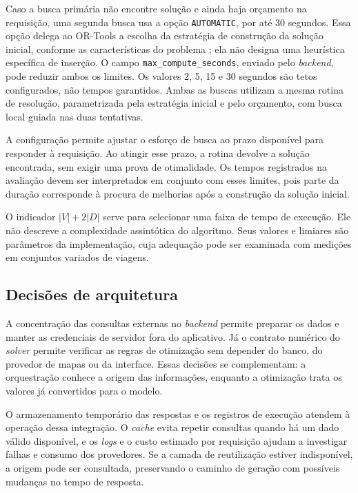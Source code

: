 Caso a busca primária não encontre solução e ainda haja orçamento na requisição, uma segunda busca usa a opção \texttt{AUTOMATIC}, por até 30 segundos. Essa opção delega ao OR-Tools a escolha da estratégia de construção da solução inicial, conforme as características do problema \cite{google_routing_options}; ela não designa uma heurística específica de inserção. O campo \texttt{max\_compute\_seconds}, enviado pelo \textit{backend}, pode reduzir ambos os limites. Os valores 2, 5, 15 e 30 segundos são tetos configurados, não tempos garantidos. Ambas as buscas utilizam a mesma rotina de resolução, parametrizada pela estratégia inicial e pelo orçamento, com busca local guiada nas duas tentativas.


A configuração permite ajustar o esforço de busca ao prazo disponível para responder à requisição. Ao atingir esse prazo, a rotina devolve a solução encontrada, sem exigir uma prova de otimalidade. Os tempos registrados na avaliação devem ser interpretados em conjunto com esses limites, pois parte da duração corresponde à procura de melhorias após a construção da solução inicial.

O indicador $|V|+2|D|$ serve para selecionar uma faixa de tempo de execução. Ele não descreve a complexidade assintótica do algoritmo. Seus valores e limiares são parâmetros da implementação, cuja adequação pode ser examinada com medições em conjuntos variados de viagens.

\subsection{Decisões de arquitetura}

A concentração das consultas externas no \textit{backend} permite preparar os dados e manter as credenciais de servidor fora do aplicativo. Já o contrato numérico do \textit{solver} permite verificar as regras de otimização sem depender do banco, do provedor de mapas ou da interface. Essas decisões se complementam: a orquestração conhece a origem das informações, enquanto a otimização trata os valores já convertidos para o modelo.

O armazenamento temporário das respostas e os registros de execução atendem à operação dessa integração. O \textit{cache} evita repetir consultas quando há um dado válido disponível, e os \textit{logs} e o custo estimado por requisição ajudam a investigar falhas e consumo dos provedores. Se a camada de reutilização estiver indisponível, a origem pode ser consultada, preservando o caminho de geração com possíveis mudanças no tempo de resposta.

